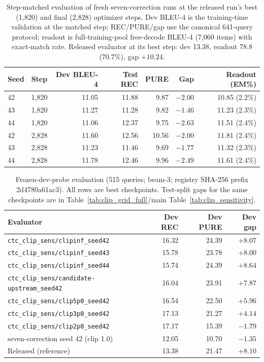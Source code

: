 \documentclass[pdflatex,sn-chicago]{sn-jnl}
\begin{document}
\begin{table}[h]
\centering
\scriptsize\setlength{\tabcolsep}{4pt}
\caption{Step-matched evaluation of fresh seven-correction runs at the released run's best (1{,}820) and final (2{,}828) optimizer steps. Dev BLEU-4 is the training-time validation at the matched step; REC/PURE/gap use the canonical 641-query protocol; readout is full-training-pool free-decode BLEU-4 (7{,}060 items) with exact-match rate. Released evaluator at its best step: dev 13.38, readout 78.8 (70.7\%), gap $+10.24$.}
\label{tab:step_matched}
\begin{tabular}{llrrrrr}
\toprule
Seed & Step & Dev BLEU-4 & Test REC & PURE & Gap & Readout (EM\%) \\
\midrule
42 & 1{,}820 & 11.05 & 11.88 & 9.87 & $-2.00$ & 10.85 (2.2\%) \\
43 & 1{,}820 & 11.27 & 11.28 & 9.82 & $-1.46$ & 11.23 (2.3\%) \\
44 & 1{,}820 & 11.06 & 12.37 & 9.75 & $-2.63$ & 11.51 (2.4\%) \\
42 & 2{,}828 & 11.60 & 12.56 & 10.56 & $-2.00$ & 11.81 (2.4\%) \\
43 & 2{,}828 & 11.23 & 11.46 & 9.69 & $-1.77$ & 11.32 (2.3\%) \\
44 & 2{,}828 & 11.78 & 12.46 & 9.96 & $-2.49$ & 11.61 (2.4\%) \\
\bottomrule
\end{tabular}
\end{table}

\begin{table}[h]
\centering
\scriptsize\setlength{\tabcolsep}{4pt}
\caption{Frozen-dev-probe evaluation (515 queries; beam-3; registry SHA-256 prefix 2d4780a61ac3). All rows are best checkpoints. Test-split gaps for the same checkpoints are in Table~\ref{tab:clip_grid_full}/main Table~\ref{tab:clip_sensitivity}.}
\label{tab:dev_probe_panel}
\begin{tabular}{lrrr}
\toprule
Evaluator & Dev REC & Dev PURE & Dev gap \\
\midrule
\texttt{ctc\_clip\_sens/clipinf\_seed42} & 16.32 & 24.39 & $+8.07$ \\
\texttt{ctc\_clip\_sens/clipinf\_seed43} & 15.78 & 23.78 & $+8.00$ \\
\texttt{ctc\_clip\_sens/clipinf\_seed44} & 15.74 & 24.39 & $+8.64$ \\
\texttt{ctc\_clip\_sens/candidate-upstream\_seed42} & 16.04 & 23.91 & $+7.87$ \\
\texttt{ctc\_clip\_sens/clip5p0\_seed42} & 16.54 & 22.50 & $+5.96$ \\
\texttt{ctc\_clip\_sens/clip3p0\_seed42} & 17.13 & 21.27 & $+4.14$ \\
\texttt{ctc\_clip\_sens/clip2p0\_seed42} & 17.17 & 15.39 & $-1.79$ \\
seven-correction seed 42 (clip 1.0) & 12.05 & 10.70 & $-1.35$ \\
\midrule
Released (reference) & 13.38 & 21.47 & $+8.10$ \\
\bottomrule
\end{tabular}
\end{table}
\end{document}
